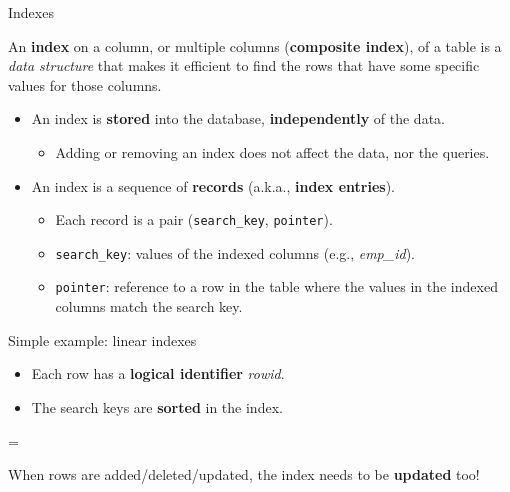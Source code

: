 \documentclass[xcolor=table]{beamer}
\newenvironment{warning}
  {\par\begin{mdframed}[linewidth=2pt,linecolor=darkred]%
    \begin{list}{}{\leftmargin=1cm
                   \labelwidth=\leftmargin}\item[\Large\ding{43}]}
  {\end{list}\end{mdframed}\par}
\begin{document}
\begin{frame}{Indexes}
  \begin{definition}[Index]
    An {\bf index} on a column, or multiple columns ({\bf composite index}), of a table is a {\em data 
    structure} that makes it efficient to find the rows that have some specific 
    values for those columns. \href{http://infolab.stanford.edu/~ullman/dscb.html}{}
  \end{definition}
  \vfill
  \begin{itemize}
    \item An index is {\bf stored} into the database, {\bf independently} of the data.
    \begin{itemize}
      \item Adding or removing an index does not affect the data, nor the queries.
    \end{itemize}
    \vfill
    \item An index is a sequence of \textbf{records} (a.k.a., \textbf{index entries}). 
    \begin{itemize}
      \item Each record is a pair (\texttt{search\_key}, \texttt{pointer}).
      \item \texttt{search\_key}: values of the indexed columns (e.g., \textit{emp\_id}).
      \item \texttt{pointer}: reference to a row in the table where the values in the indexed columns 
      match the search key.
    \end{itemize}
  \end{itemize}

\end{frame}

\begin{frame}{Simple example: linear indexes}
\begin{itemize}
  \item Each row has a {\bf logical identifier} {\em rowid}.
  \item The search keys are \textbf{sorted} in the index. 
\end{itemize}
\begin{center}
\end{center}
\vfill
\begin{warning}
  When rows are added/deleted/updated, the index needs to be {\bf updated} too!
\end{warning}
\end{frame}
\end{document}
